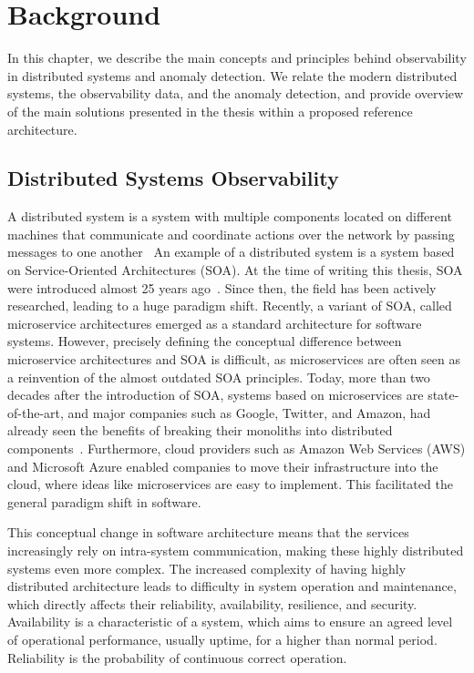 \chapter{Background}\label{ch:background} %
\minitoc%
\bigskip

In this chapter, we describe the main concepts and principles behind observability in distributed systems and anomaly detection. We relate the modern distributed systems, the observability data, and the anomaly detection, and provide overview of the main solutions presented in the thesis within a proposed reference architecture. 

\section{Distributed Systems Observability}
A distributed system is a system with multiple components located on different machines that communicate and coordinate actions over the network by passing messages to one another~\cite{tanenbaum2007distributed}
An example of a distributed system is a system based on Service-Oriented Architectures (SOA). At the time of writing this thesis, SOA were introduced almost 25 years ago~\cite{abrams2008service}. Since then, the field has been actively researched, leading to a huge paradigm shift. Recently, a variant of SOA, called microservice architectures emerged as a standard architecture for software systems. However, precisely defining the conceptual difference between microservice architectures and SOA is difficult, as microservices are often seen as a reinvention of the almost outdated SOA principles. Today, more than two decades after the introduction of SOA, systems based on microservices are state-of-the-art, and major companies such as Google, Twitter, and Amazon, had already seen the benefits of breaking their monoliths into distributed components~\cite{observability2020practical}. Furthermore, cloud providers such as Amazon Web Services (AWS) and Microsoft Azure enabled companies to move their infrastructure into the cloud, where ideas like microservices are easy to implement. This facilitated the general paradigm shift in software. 

This conceptual change in software architecture means that the services increasingly rely on intra-system communication, making these highly distributed systems even more complex. The increased complexity of having highly distributed architecture leads to difficulty in system operation and maintenance, which directly affects their reliability, availability, resilience, and security.
Availability is a characteristic of a system, which aims to ensure an agreed level of operational performance, usually uptime, for a higher than normal period. Reliability is the probability of continuous correct operation. 

